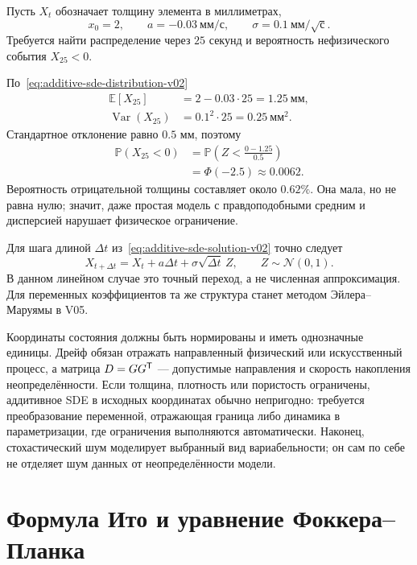 Пусть $X_t$ обозначает толщину элемента в миллиметрах,
\[
x_0=2,
\qquad
a=-0.03\ \text{мм}/\text{с},
\qquad
\sigma=0.1\ \text{мм}/\sqrt{\text{с}}.
\]
Требуется найти распределение через $25$ секунд и вероятность нефизического события $X_{25}<0$.

По~\eqref{eq:additive-sde-distribution-v02}
\begin{align}
\mathbb E[X_{25}]
&=
2-0.03\cdot25
=
1.25\ \text{мм},
\\
\operatorname{Var}(X_{25})
&=
0.1^2\cdot25
=
0.25\ \text{мм}^2.
\end{align}
Стандартное отклонение равно $0.5$ мм, поэтому
\begin{align}
\mathbb P(X_{25}<0)
&=
\mathbb P\!\left(
Z<\frac{0-1.25}{0.5}
\right)
\\
&=
\Phi(-2.5)
\approx
0.0062.
\end{align}
Вероятность отрицательной толщины составляет около $0.62\%$. Она мала, но не равна нулю; значит, даже простая модель с правдоподобными средним и дисперсией нарушает физическое ограничение.

Для шага длиной $\Delta t$ из~\eqref{eq:additive-sde-solution-v02} точно следует
\begin{equation}
\label{eq:additive-sde-exact-step-v02}
X_{t+\Delta t}
=
X_t
+
a\Delta t
+
\sigma\sqrt{\Delta t}\,Z,
\qquad
Z\sim\mathcal N(0,1).
\end{equation}
В данном линейном случае это точный переход, а не численная аппроксимация. Для переменных коэффициентов та же структура станет методом Эйлера--Маруямы в V05.

\begin{application}
Координаты состояния должны быть нормированы и иметь однозначные единицы. Дрейф обязан отражать направленный физический или искусственный процесс, а матрица $D=GG^{\mathsf{T}}$ --- допустимые направления и скорость накопления неопределённости. Если толщина, плотность или пористость ограничены, аддитивное SDE в исходных координатах обычно непригодно: требуется преобразование переменной, отражающая граница либо динамика в параметризации, где ограничения выполняются автоматически. Наконец, стохастический шум моделирует выбранный вид вариабельности; он сам по себе не отделяет шум данных от неопределённости модели.
\end{application}

\section{Формула Ито и уравнение Фоккера--Планка}
\label{sec:ito-formula-fokker-planck}

